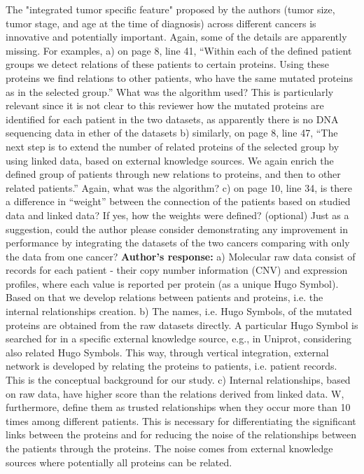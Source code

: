 \documentclass{bmcart}
\begin{document}
The "integrated tumor specific feature" proposed by the authors (tumor size, tumor stage, and age at the time of diagnosis) across different cancers is innovative and potentially important. Again, some of the details are apparently missing. For examples, a) on page 8, line 41, “Within each of the defined patient groups we detect relations of these patients to certain proteins. Using these proteins we find relations to other patients, who have the same mutated proteins as in the selected group.” What was the algorithm used? This is particularly relevant since it is not clear to this reviewer how the mutated proteins are identified for each patient in the two datasets, as apparently there is no DNA sequencing data in ether of the datasets
b) similarly, on page 8, line 47, “The next step is to extend the number of related proteins of the selected group by using linked data, based on external knowledge sources. We again enrich the defined group of patients through new relations to proteins, and then to other related patients.” Again, what was the algorithm?
c) on page 10, line 34, is there a difference in “weight” between the connection of the patients based on studied data and linked data? If yes, how the weights were defined? (optional) Just as a suggestion, could the author please consider demonstrating any improvement in performance by integrating the datasets of the two cancers comparing with only the data from one cancer?
\newline \textbf{Author's response:}
a) Molecular raw data consist of records for each patient - their copy number information (CNV) and expression profiles, where each value is reported per protein (as a unique Hugo Symbol). Based on that we develop relations between patients and proteins, i.e. the internal relationships creation. b) The names, i.e. Hugo Symbols, of the mutated proteins are obtained from the raw datasets directly. A particular Hugo Symbol is searched for in a specific external knowledge source, e.g., in Uniprot, considering also related Hugo Symbols. This way, through vertical integration, external network is developed by relating the proteins to patients, i.e. patient records. This is the conceptual background for our study.
c) Internal relationships, based on raw data, have higher score than the relations derived from linked data. W, furthermore, define them as trusted relationships when they occur more than 10 times among different patients. This is necessary for differentiating the significant links between the proteins and for reducing the noise of the relationships between the patients through the proteins. The noise comes from external knowledge sources where potentially all proteins can be related.
\end{document}
